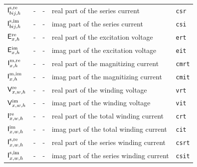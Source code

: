 \documentclass[journal]{IEEEtran}
\begin{document}
\begin{table}[H]
\begin{tabular}{l r r l l }
        $\mathsf{I}^{\text{s,re}}_{bij,h}$             & -                                     & -                                         & real part of the series current           & \texttt{csr}      \\ 
        $\mathsf{I}^{\text{s,im}}_{bij,h}$        & -                                     & -                                         & imag part of the series current           & \texttt{csi}      \\ \hline
        $\mathsf{E}^{\text{re}}_{x,h}$              & -                                     & -                                         & real part of the excitation voltage       & \texttt{ert}      \\
        $\mathsf{E}^{\text{im}}_{x,h}$         & -                                     & -                                         & imag part of the excitation voltage       & \texttt{eit}      \\
        $\mathsf{I}^{\text{m,re}}_{x,h}$             & -                                     & -                                         & real part of the magnitizing current      & \texttt{cmrt}     \\
        $\mathsf{I}^{\text{m,im}}_{x,h}$        & -                                     & -                                         & imag part of the magnitizing current      & \texttt{cmit}     \\
        $\mathsf{V}^{\text{re}}_{x,w,h}$            & -                                     & -                                         & real part of the winding voltage          & \texttt{vrt}      \\
        $\mathsf{V}^{\text{im}}_{x,w,h}$       & -                                     & -                                         & imag part of the winding voltage          & \texttt{vit}      \\
        $\mathsf{I}^{\text{re}}_{x,w,h}$               & -                                     & -                                         & real part of the total winding current    & \texttt{crt}      \\ 
        $\mathsf{I}^{\text{im}}_{x,w,h}$          & -                                     & -                                         & imag part of the total winding current    & \texttt{cit}      \\ 
        $\mathsf{I}^{\text{s,re}}_{x,w,h}$         & -                                     & -                                         & real part of the series winding current   & \texttt{csrt}     \\ 
        $\mathsf{I}^{\text{s,im}}_{x,w,h}$    & -                                     & -                                         & imag part of the series winding current   & \texttt{csit}     \\
    \end{tabular}
\end{table}
\end{document}
